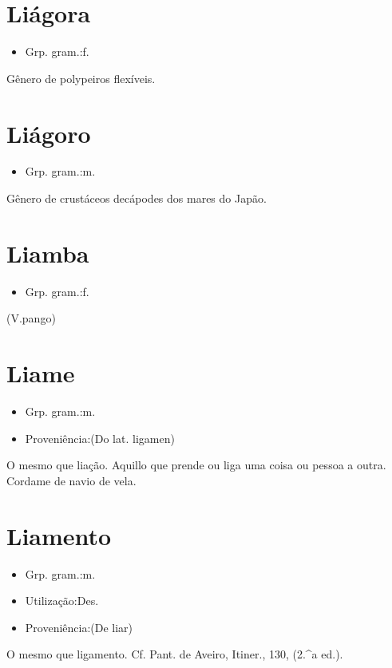 \section{Liágora}
\begin{itemize}
\item {Grp. gram.:f.}
\end{itemize}
Gênero de polypeiros flexíveis.
\section{Liágoro}
\begin{itemize}
\item {Grp. gram.:m.}
\end{itemize}
Gênero de crustáceos decápodes dos mares do Japão.
\section{Liamba}
\begin{itemize}
\item {Grp. gram.:f.}
\end{itemize}
(V.pango)
\section{Liame}
\begin{itemize}
\item {Grp. gram.:m.}
\end{itemize}
\begin{itemize}
\item {Proveniência:(Do lat. \textunderscore ligamen\textunderscore )}
\end{itemize}
O mesmo que \textunderscore liação\textunderscore .
Aquillo que prende ou liga uma coisa ou pessoa a outra.
Cordame de navio de vela.
\section{Liamento}
\begin{itemize}
\item {Grp. gram.:m.}
\end{itemize}
\begin{itemize}
\item {Utilização:Des.}
\end{itemize}
\begin{itemize}
\item {Proveniência:(De \textunderscore liar\textunderscore )}
\end{itemize}
O mesmo que \textunderscore ligamento\textunderscore . Cf. Pant. de Aveiro, \textunderscore Itiner.\textunderscore , 130, (2.^a ed.).
